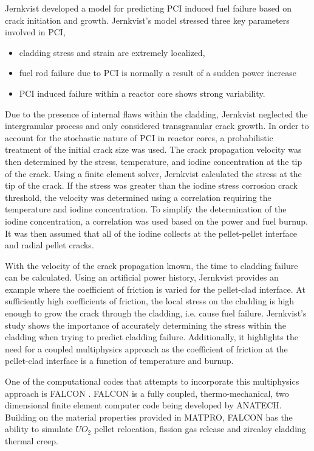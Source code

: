 \documentclass[edeposit,fullpage,11pt]{uiucthesis2009}
\begin{document}
Jernkvist \cite{jernkvist_model_1995} developed a model for predicting \gls{PCI} induced fuel failure based on crack initiation and growth.
Jernkvist's model stressed three key parameters involved in \gls{PCI},
\begin{itemize} 
\item cladding stress and strain are extremely localized, 
\item fuel rod failure due to \gls{PCI} is normally a result of a sudden power increase 
\item \gls{PCI} induced failure within a reactor core shows strong variability.
\end{itemize}
Due to the presence of internal flaws within the cladding, Jernkvist neglected the intergranular process and only considered transgranular crack growth.
In order to account for the stochastic nature of \gls{PCI} in reactor cores, a probabilistic treatment of the initial crack size was used.
The crack propagation velocity was then determined by the stress, temperature, and iodine concentration at the tip of the crack.
Using a finite element solver, Jernkvist calculated the stress at the tip of the crack.
If the stress was greater than the iodine stress corrosion crack threshold, the velocity was determined using a correlation requiring the temperature and iodine concentration.
To simplify the determination of the iodine concentration, a correlation was used based on the power and fuel burnup.
It was then assumed that all of the iodine collects at the pellet-pellet interface and radial pellet cracks.

With the velocity of the crack propagation known, the time to cladding failure can be calculated.
Using an artificial power history, Jernkvist provides an example where the coefficient of friction is varied for the pellet-clad interface.
At sufficiently high coefficients of friction, the local stress on the cladding is high enough to grow the crack through the cladding, i.e. cause fuel failure.
Jernkvist's study shows the importance of accurately determining the stress within the cladding when trying to predict cladding failure.
Additionally, it highlights the need for a coupled multiphysics approach as the coefficient of friction at the pellet-clad interface is a function of temperature and burnup.

One of the computational codes that attempts to incorporate this multiphysics approach is FALCON \cite{montgomery_falcon_1997}.
FALCON is a fully coupled, thermo-mechanical, two dimensional finite element computer code being developed by ANATECH.
Building on the material properties provided in MATPRO, FALCON has the ability to simulate $UO_2$ pellet relocation, fission gas release and zircaloy cladding thermal creep.
\end{document}
